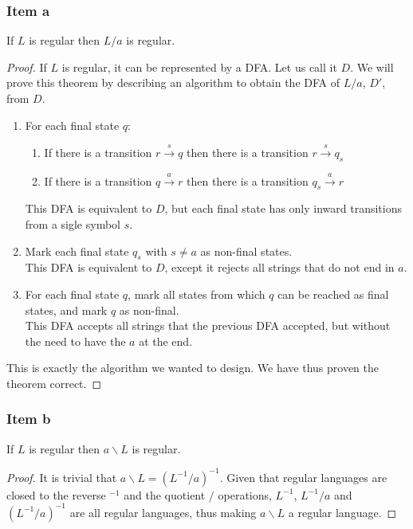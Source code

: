 \documentclass[docid=TP07]{tcom_TP}
\begin{document}
{\subsubsection{Item a}
\begin{theorem}
If $L$ is regular then $L/a$ is regular.
\end{theorem}
\begin{proof}
If $L$ is regular, it can be represented by a DFA. Let us call it $D$. We will prove this theorem by describing an algorithm to obtain the DFA of $L/a$, $D'$, from $D$.
\begin{enumerate}
	\item For each final state $q$:
	\begin{enumerate}
		\item If there is a transition $r \xrightarrow{s} q$ then there is a transition $r \xrightarrow{s} q_s$
		\item If there is a transition $q \xrightarrow{a} r$ then there is a transition $q_s \xrightarrow{a} r$ 
	\end{enumerate}
	This DFA is equivalent to $D$, but each final state has only inward transitions from a sigle symbol $s$.
	\item Mark each final state $q_s$ with $s \neq a$ as non-final states.\\
	This DFA is equivalent to $D$, except it rejects all strings that do not end in $a$.
	\item For each final state $q$, mark all states from which $q$ can be reached as final states, and mark $q$ as non-final.\\
	This DFA accepts all strings that the previous DFA accepted, but without the need to have the $a$ at the end.
\end{enumerate}
This is exactly the algorithm we wanted to design. We have thus proven the theorem correct.
\end{proof}
\subsubsection{Item b}
\begin{theorem}
If $L$ is regular then $a\backslash L$ is regular.
\end{theorem}
\begin{proof}
It is trivial that $a \backslash L=(L^{-1}/a)^{-1}$. Given that regular languages are closed to the reverse $^{-1}$ and the quotient $/$ operations, $L^{-1}$, $L^{-1}/a$ and $(L^{-1}/a)^{-1}$ are all regular languages, thus making $a \backslash L$ a regular language.
\end{proof}
}
\end{document}
